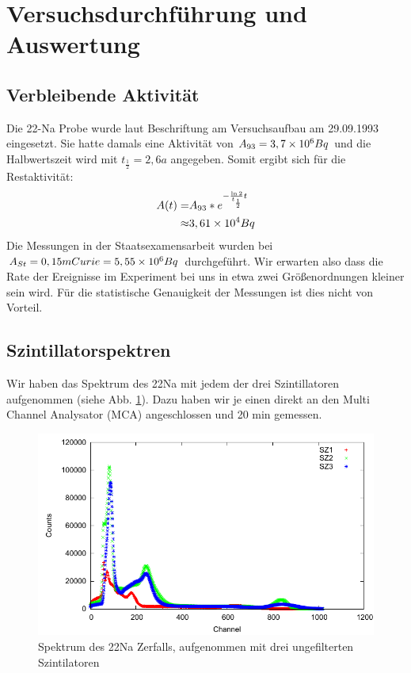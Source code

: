 \section{Versuchsdurchführung und Auswertung}

\subsection{Verbleibende Aktivität}

Die 22-Na Probe wurde laut Beschriftung am Versuchsaufbau am 29.09.1993 eingesetzt. Sie hatte damals eine Aktivität von $A_{93} = 3,7\times 10^{6} Bq$ und die Halbwertszeit wird mit $t_{\frac{1}{2}} = 2,6 a$ angegeben. Somit ergibt sich für die Restaktivität:
\begin{eqnarray*}
 A(t) = & A_{93} * e^{-\frac{\ln 2}{t_\frac{1}{2}} t} \\
      \approx & 3,61\times 10^{4} Bq
\end{eqnarray*}
Die Messungen in der Staatsexamensarbeit wurden bei $A_{St} = 0,15 mCurie = 5,55\times 10^{6} Bq$ durchgeführt. Wir erwarten also dass die Rate der Ereignisse im Experiment bei uns in etwa zwei Größenordnungen kleiner sein wird. Für die statistische Genauigkeit der Messungen ist dies nicht von Vorteil.

\subsection{Szintillatorspektren}
Wir haben das Spektrum des 22Na mit jedem der drei Szintillatoren aufgenommen (siehe Abb. \ref{22na-schrottspektrum}). Dazu haben wir je einen direkt an den Multi Channel Analysator (MCA) angeschlossen und 20 min gemessen.

\begin{figure}
 \includegraphics[width=\textwidth]{Graphen/Na-Spektren/na-spektren-1.pdf}
 \caption{Spektrum des 22Na Zerfalls, aufgenommen mit drei ungefilterten Szintilatoren}
 \label{22na-schrottspektrum}
\end{figure}


